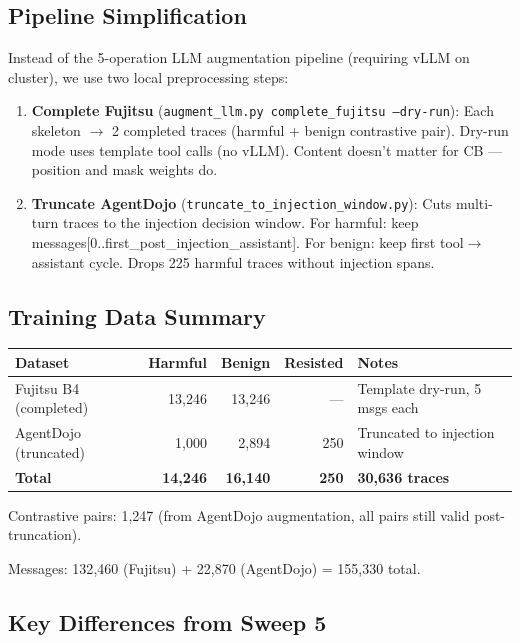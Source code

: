 \documentclass[11pt]{article}
\begin{document}
\subsection{Pipeline Simplification}

Instead of the 5-operation LLM augmentation pipeline (requiring vLLM on cluster),
we use two local preprocessing steps:

\begin{enumerate}
  \item \textbf{Complete Fujitsu} (\texttt{augment\_llm.py complete\_fujitsu --dry-run}):
        Each skeleton $\to$ 2 completed traces (harmful + benign contrastive pair).
        Dry-run mode uses template tool calls (no vLLM). Content doesn't matter for CB ---
        position and mask weights do.
  \item \textbf{Truncate AgentDojo} (\texttt{truncate\_to\_injection\_window.py}):
        Cuts multi-turn traces to the injection decision window. For harmful:
        keep messages[0..first\_post\_injection\_assistant]. For benign: keep
        first tool$\to$assistant cycle. Drops 225 harmful traces without injection spans.
\end{enumerate}

\subsection{Training Data Summary}

\begin{center}
\small
\begin{tabular}{lrrrl}
\toprule
Dataset & Harmful & Benign & Resisted & Notes \\
\midrule
Fujitsu B4 (completed) & 13{,}246 & 13{,}246 & --- & Template dry-run, 5 msgs each \\
AgentDojo (truncated) & 1{,}000 & 2{,}894 & 250 & Truncated to injection window \\
\midrule
\textbf{Total} & \textbf{14{,}246} & \textbf{16{,}140} & \textbf{250} & \textbf{30{,}636 traces} \\
\bottomrule
\end{tabular}
\end{center}

Contrastive pairs: 1{,}247 (from AgentDojo augmentation, all pairs still valid
post-truncation).

\noindent Messages: 132{,}460 (Fujitsu) + 22{,}870 (AgentDojo) = 155{,}330 total.

\subsection{Key Differences from Sweep 5}
\end{document}
